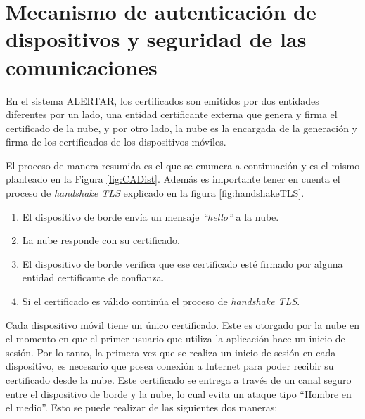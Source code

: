 \section{Mecanismo de autenticación de dispositivos y seguridad de las comunicaciones}
\label{sec:autentic_seguridad}
En el sistema ALERTAR, los certificados son emitidos por dos entidades diferentes por un lado, una entidad certificante externa que genera y firma el certificado de la nube, y por otro lado, la nube es la encargada de la generación y firma de los certificados de los dispositivos móviles.

El proceso de manera resumida es el que se enumera a continuación y es el mismo planteado en la Figura \ref{fig:CADist}. Además es importante tener en cuenta el proceso de \textit{handshake TLS} explicado en la figura \ref{fig:handshakeTLS}.
\begin{enumerate}
    \item El dispositivo de borde envía un mensaje \textit{``hello''} a la nube.
    \item La nube responde con su certificado.
    \item El dispositivo de borde verifica que ese certificado esté firmado por alguna entidad certificante de confianza.
    \item Si el certificado es válido continúa el proceso de \textit{handshake TLS}.
\end{enumerate}

Cada dispositivo móvil tiene un único certificado. Este es otorgado por la nube en el momento en que el primer usuario que utiliza la aplicación hace un inicio de sesión. Por lo tanto, la primera vez que se realiza un inicio de sesión en cada dispositivo, es necesario que posea conexión a Internet para poder recibir su certificado desde la nube. Este certificado se entrega a través de un canal seguro entre el dispositivo de borde y la nube, lo cual evita un ataque tipo ``Hombre en el medio''. Esto se puede realizar de las siguientes dos maneras:

